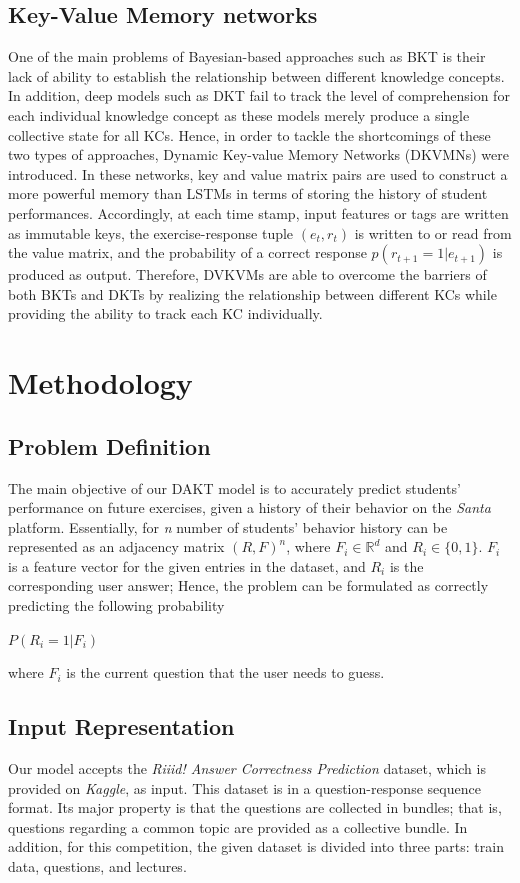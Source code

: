 \documentclass{article}
\begin{document}
\subsection{Key-Value Memory networks}
One of the main problems of Bayesian-based approaches such as BKT \cite{Baker2008} is their lack of ability to establish the relationship between different knowledge concepts. In addition, deep models such as DKT \cite{Xiong2016} fail to track the level of comprehension for each individual knowledge concept as these models merely produce a single collective state for all KCs. Hence, in order to tackle the shortcomings of these two types of approaches, Dynamic Key-value Memory Networks (DKVMNs)\cite{Zhang2017} were introduced. In these networks, key and value matrix pairs are used to construct a more powerful memory than LSTMs in terms of storing the history of student performances. Accordingly, at each time stamp, input features or tags are written as immutable keys, the exercise-response tuple $(e_t, r_t)$ is written to or read from the value matrix, and the probability of a correct response $p(r_{t+1}=1|e_{t+1})$ is produced as output. Therefore, DVKVMs are able to overcome the barriers of both BKTs and DKTs by realizing the relationship between different KCs while providing the ability to track each KC individually.

\section{Methodology}

\subsection{Problem Definition}
The main objective of our DAKT model is to accurately predict students' performance on future exercises, given a history of their behavior on the \emph{Santa} platform. Essentially, for \emph{n} number of students' behavior history can be represented as an adjacency matrix $(R, F)^{n}$, where $F_i \in\mathbb{R}^{d}$ and $R_i \in \{0,1\}$. $F_{i}$ is a feature vector for the given entries in the dataset, and $R_{i}$ is the corresponding user answer; Hence, the problem can be formulated as correctly predicting the following probability
\begin{center}
    $P(R_{i}=1|F_{i})$
\end{center}
where $F_{i}$ is the current question that the user needs to guess.

\subsection{Input Representation}
\label{input_representation}
Our model accepts the \emph{Riiid! Answer Correctness Prediction} dataset, which is provided on \emph{Kaggle}, as input. This dataset is in a question-response sequence format. Its major property is that the questions are collected in bundles; that is, questions regarding a common topic are provided as a collective bundle. In addition, for this competition, the given dataset is divided into three parts: train data, questions, and lectures.
\end{document}
